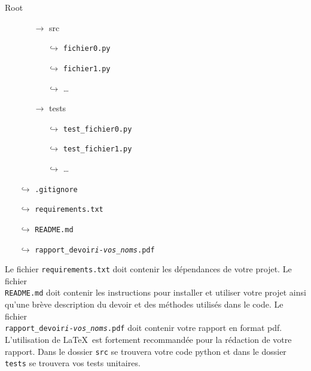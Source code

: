 \documentclass[12pt, letterpaper]{article}
\begin{document}
Root
\begin{itemize}
    \item[]
        \begin{itemize}
            \item[$\rightarrow$] src
                \begin{itemize}
                    \item[$\hookrightarrow$] \texttt{fichier0.py}
                    \item[$\hookrightarrow$] \texttt{fichier1.py}
                    \item[$\hookrightarrow$] \dots
              \end{itemize}
        \end{itemize}
  \item[]
  \begin{itemize}
    \item[$\rightarrow$] tests
    \begin{itemize}
      \item[$\hookrightarrow$] \texttt{test\_fichier0.py}
      \item[$\hookrightarrow$] \texttt{test\_fichier1.py}
      \item[$\hookrightarrow$] \dots
    \end{itemize}
  \end{itemize}
  \item[$\hookrightarrow$] \texttt{.gitignore}
  \item[$\hookrightarrow$] \texttt{requirements.txt}
  \item[$\hookrightarrow$] \texttt{README.md}
  \item[$\hookrightarrow$] \texttt{rapport\_devoir\emph{i}-\emph{vos\_noms}.pdf}
\end{itemize}

\bigskip

\noindent Le fichier \texttt{requirements.txt} doit contenir les dépendances de votre projet.
Le fichier \\\texttt{README.md} doit contenir les instructions pour installer et utiliser votre projet ainsi
qu'une brève description du devoir et des méthodes utilisés dans le code.
Le fichier \\\texttt{rapport\_devoir\emph{i}-\emph{vos\_noms}.pdf} doit contenir votre rapport en format pdf.
L'utilisation de \LaTeX\ est fortement recommandée pour la rédaction de votre rapport.
Dans le dossier \texttt{src} se trouvera votre code python et dans le dossier \texttt{tests} se trouvera vos tests
unitaires.
\end{document}
